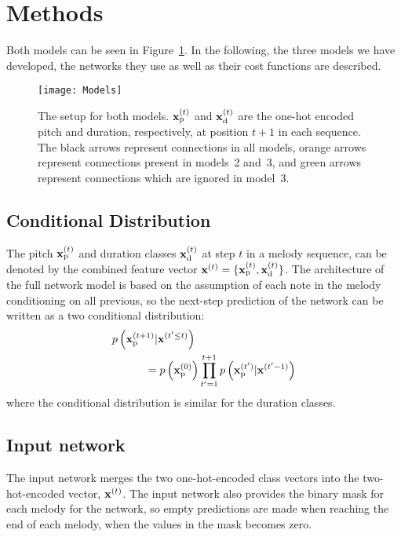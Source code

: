 \section{Methods}
\label{sec:method}

Both models can be seen in Figure~\ref{fig:methods:models}.
In the following, the three models we have developed, the networks they use as well as their cost functions are described.

\begin{figure*}
	\centering
	\texttt{[image: Models]}
	\caption{The setup for both models. $\bm{\mathrm{x}}^{(t)}_{\text{p}}$ and $\bm{\mathrm{x}}^{(t)}_{\text{d}}$ are the one-hot encoded pitch and duration, respectively, at position $t + 1$ in each sequence. The black arrows represent connections in all models, orange arrows represent connections present in models~2 and~3, and green arrows represent connections which are ignored in model~3.}
	\label{fig:methods:models}
\end{figure*}

\subsection{Conditional Distribution} %
\label{sub:conditional_distribution}
	The pitch $\bm{\mathrm{x}}^{(t)}_{\text{p}}$ and duration classes $\bm{\mathrm{x}}^{(t)}_{\text{d}}$ at step $t$ in a melody sequence, can be denoted by the combined feature vector $\bm{\mathrm{x}}^{(t)}=\{\bm{\mathrm{x}}^{(t)}_{\text{p}},\bm{\mathrm{x}}^{(t)}_{\text{d}}\}$.	
	The architecture of the full network model is based on the assumption of each note in the melody conditioning on all previous, so the next-step prediction of the network can be written as a two conditional distribution:
	\begin{gather}
		\begin{split}
		\MoveEqLeft[3]
				p\left(\vec{x}\order{t+1}\idx{p}|\vec{x}\order{t'\le t}\right) \\ 
				& = p\left(\vec{x}\order{0}\idx{p}\right) \prod^{t+1}_{t'=1} p\left(\vec{x}\order{t'}\idx{p}|\vec{x}\order{t'-1}\right) \label{}
		\end{split} 	
	\end{gather}
	where the conditional distribution is similar for the duration classes.

\subsection{Input network} %
\label{sub:input_network}
The input network merges the two one-hot-encoded class vectors into the two-hot-encoded vector, $\bm{\mathrm{x}}^{(t)}$. The input network also provides the binary mask for each melody for the network, so empty predictions are made when reaching the end of each melody, when the values in the mask becomes zero.

